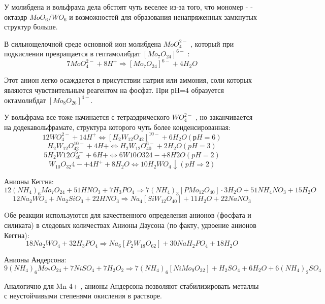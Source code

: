 \documentclass[11pt]{article}
\begin{document}
У молибдена и вольфрама дела обстоят чуть веселее из-за того, что мономер -
- октаэдр $MoO _6 / WO _6$ и возможностей для образования ненапряженных
замкнутых структур больше.

В сильнощелочной среде основной ион молибдена $MoO _4 ^{2-}$ , который при
подкислении превращается в гептамолибдат $[Mo _7 O _{24} ] ^{6-}$ :
$$7MoO _4 ^{2-} +8H ^+ \Rightarrow[Mo _7 O _{24} ] ^{6-} +4H _2 O$$

Этот анион легко осаждается в присутствии натрия или аммония, соли которых
являются чувствительным реагентом на фосфат. При рH=4 образуется
октамолибдат $[Mo _8 O _{26} ] ^{4-}$.

У вольфрама все тоже начинается с тетраэдрического $WO_4 ^{2-}$ , но заканчивается
на додекавольфрамате, структура которого чуть более конденсированная:
$$12WO _4 ^{2-} +14H ^+ \Leftrightarrow [H _2 W _{12} O _{42} ] ^{10-} +6H _2 O (рH=6)$$
$$H _2 W _{12} O _{42} ^{10-} + 4H + \Leftrightarrow H _2 W _{12} O _{40} ^{6-} + 2H _2 O (pH = 3)$$
$$5H _2 W 12 O _{40} ^{6-} + 6H + \Leftrightarrow 6W 10 O 32 4- + 8H 2 O (pH = 2)$$
$$W _{10} O _{32} 4- + 4H ^+ + 8H _2 O \Leftrightarrow 10H _2 WO _4 \downarrow (pH\Rightarrow2)$$

Анионы Кеггна:
$$12(NH _4 ) _6 Mo _7 O _{24} + 51HNO _3 + 7H _3 PO _4 \Rightarrow 7(NH _4 ) _3 [PMo _{12} O _{40} ] \cdot 3H _2 O+51NH _4 NO _3 + 15H _2 O$$
$$12Na _2 WO _4 + Na _2 SiO _3 + 22HNO _3 \Rightarrow Na _4 [SiW _{12} O _{40} ] + 11H _2 O + 22NaNO _3$$

Oбе реакции используются для качественного определения анионов (фосфата
и силиката) в следовых количествах
Анионы Даусона (по факту, удвоение анионов Кеггна):
$$18Na _2 WO _4 + 32H _3 PO _4 \Rightarrow Na _6 [P _2 W _{18} O _{62} ] + 30NaH _2 PO _4 + 18H _2 O$$

Анионы Андерсона:
$$9(NH _4 ) _6 Mo _7 O _{24} + 7NiSO _4 + 7H _2 O _2 \Rightarrow7(NH _4 ) _6 [NiMo _9 O _{32} ] + H _2 SO _4 + 6H _2 O +6(NH _4 ) _2 SO _4$$

Аналогично для Mn 4+ , анионы Андерсона позволяют стабилизировать металлы
с неустойчивыми степенями окисления в растворе.
\end{document}
